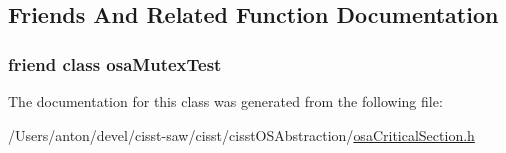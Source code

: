 \subsection{Friends And Related Function Documentation}
\hypertarget{classosa_critical_section_a5de70802de08aa05e0bf7bdbad8bd9cc}{}
\subsubsection[{osa\+Mutex\+Test}]{\setlength{\rightskip}{0pt plus 5cm}friend class osa\+Mutex\+Test\hspace{0.3cm}{\ttfamily [friend]}}\label{classosa_critical_section_a5de70802de08aa05e0bf7bdbad8bd9cc}


The documentation for this class was generated from the following file\+:\begin{DoxyCompactItemize}
\item 
/\+Users/anton/devel/cisst-\/saw/cisst/cisst\+O\+S\+Abstraction/\hyperlink{osa_critical_section_8h}{osa\+Critical\+Section.\+h}\end{DoxyCompactItemize}
